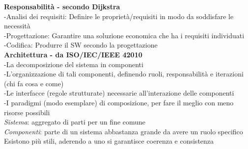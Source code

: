 \documentclass{article}
\begin{document}
		\textbf{Responsabilità - secondo Dijkstra}\\
		-Analisi dei requisiti: Definire le proprietà/requisiti in modo da soddisfare le necessità\\
		-Progettazione: Garantire una soluzione economica che ha i requisiti individuati\\
		-Codifica: Produrre il SW secondo la progettazione\\
		
		\textbf{Architettura - da ISO/IEC/IEEE 42010}\\
		-La decomposizione del sistema in componenti\\
		-L'organizzazione di tali componenti, definendo ruoli, responsabilità e iterazioni (chi fa cosa e come)\\
		-Le interfacce (regole strutturate) necessarie all'interazione delle componenti\\
		-I paradigmi (modo esemplare) di composizione, per fare il meglio con meno risorse possibili\\
		
		\textit{Sistema}: aggregato di parti per un fine comune\\
		\textit{Componenti}: parte di un sistema abbastanza grande da avere un ruolo specifico\\
		
		Esistono più stili, aderendo a uno si garantisce coerenza e consistenza\\
		
\end{document}
